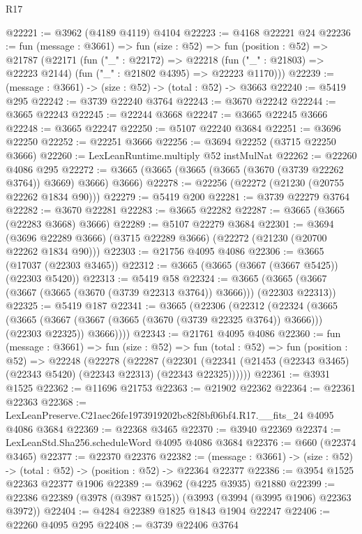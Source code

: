 \begin{lexlean}{R17}
\begin{coremodule}
@22221 := @3962 (@4189 @4119) @4104
@22223 := @4168 @22221 @24
@22236 := fun (message : @3661) =>
  fun (size : @52) =>
  fun (position : @52) =>
  @21787
    (@22171
      (fun ("_" : @22172) =>
      @22218 (fun ("_" : @21803) => @22223 @2144) (fun ("_" : @21802 @4395) => @22223 @1170)))
@22239 := (message : @3661) -> (size : @52) -> (total : @52) -> @3663
@22240 := @5419 @295
@22242 := @3739 @22240 @3764
@22243 := @3670 @22242
@22244 := @3665 @22243
@22245 := @22244 @3668
@22247 := @3665 @22245 @3666
@22248 := @3665 @22247
@22250 := @5107 @22240 @3684
@22251 := @3696 @22250
@22252 := @22251 @3666
@22256 := @3694 @22252 (@3715 @22250 @3666)
@22260 := LexLeanRuntime.multiply @52 instMulNat
@22262 := @22260 @4086 @295
@22272 := @3665 (@3665 (@3665 (@3665 (@3670 (@3739 @22262 @3764)) @3669) @3666) @3666)
@22278 := @22256 (@22272 (@21230 (@20755 @22262 @1834 @90)))
@22279 := @5419 @200
@22281 := @3739 @22279 @3764
@22282 := @3670 @22281
@22283 := @3665 @22282
@22287 := @3665 (@3665 (@22283 @3668) @3666)
@22289 := @5107 @22279 @3684
@22301 := @3694
    (@3696 @22289 @3666)
    (@3715 @22289 @3666)
    (@22272 (@21230 (@20700 @22262 @1834 @90)))
@22303 := @21756 @4095 @4086
@22306 := @3665 (@17037 (@22303 @3465))
@22312 := @3665 (@3665 (@3667 (@3667 @5425)) (@22303 @5420))
@22313 := @5419 @58
@22324 := @3665 (@3665 (@3667 (@3667 (@3665 (@3670 (@3739 @22313 @3764)) @3666))) (@22303 @22313))
@22325 := @5419 @187
@22341 := @3665
    (@22306
      (@22312
        (@22324
          (@3665
            (@3665 (@3667 (@3667 (@3665 (@3670 (@3739 @22325 @3764)) @3666))) (@22303 @22325))
            @3666))))
@22343 := @21761 @4095 @4086
@22360 := fun (message : @3661) =>
  fun (size : @52) =>
  fun (total : @52) =>
  fun (position : @52) =>
  @22248
    (@22278
      (@22287
        (@22301 (@22341 (@21453 (@22343 @3465) (@22343 @5420) (@22343 @22313) (@22343 @22325))))))
@22361 := @3931 @1525
@22362 := @11696 @21753
@22363 := @21902 @22362
@22364 := @22361 @22363
@22368 := LexLeanPreserve.C21aec26fe1973919202bc82f8bf06bf4.R17.__fits_24 @4095 @4086 @3684
@22369 := @22368 @3465
@22370 := @3940 @22369
@22374 := LexLeanStd.Sha256.scheduleWord @4095 @4086 @3684
@22376 := @660 (@22374 @3465)
@22377 := @22370 @22376
@22382 := (message : @3661) -> (size : @52) -> (total : @52) -> (position : @52) -> @22364 @22377
@22386 := @3954 @1525 @22363 @22377 @1906
@22389 := @3962 (@4225 @3935) @21880
@22399 := @22386 @22389 (@3978 (@3987 @1525)) (@3993 (@3994 (@3995 @1906) @22363 @3972))
@22404 := @4284 @22389 @1825 @1843 @1904 @22247
@22406 := @22260 @4095 @295
@22408 := @3739 @22406 @3764

\end{coremodule}
\end{lexlean}
